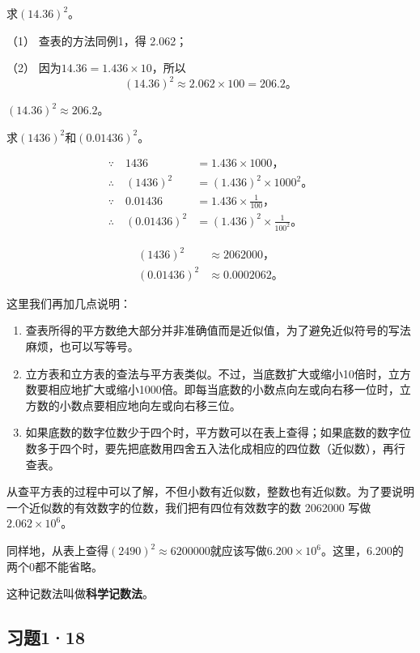  求\((14.36)^2\)。

 （1） 查表的方法同例1，得 2.062；

（2） 因为\(14.36 = 1.436 \times 10\)，所以
\[
(14.36)^2 \approx 2.062 \times 100 = 206.2。
\]

 \((14.36)^2 \approx 206.2\)。

 求\((1436)^2\)和\((0.01436)^2\)。

\begin{align*}
\because\quad 1436 &= 1.436 \times 1000， \\
\therefore\quad (1436)^2 &= (1.436)^2 \times 1000^2。 \\
\because\quad 0.01436 &= 1.436 \times \frac{1}{100}， \\
\therefore\quad (0.01436)^2 &= (1.436)^2 \times \frac{1}{100^2}。
\end{align*}

\begin{align*}
(1436)^2 &\approx 2062000， \\
(0.01436)^2 &\approx 0.0002062。
\end{align*}

这里我们再加几点说明：

\begin{enumerate}
\item 查表所得的平方数绝大部分并非准确值而是近似值，为了避免近似符号的写法麻烦，也可以写等号。
\item 立方表和立方表的查法与平方表类似。不过，当底数扩大或缩小10倍时，立方数要相应地扩大或缩小1000倍。即每当底数的小数点向左或向右移一位时，立方数的小数点要相应地向左或向右移三位。
\item 如果底数的数字位数少于四个时，平方数可以在表上查得；如果底数的数字位数多于四个时，要先把底数用四舍五入法化成相应的四位数（近似数），再行查表。
\end{enumerate}

从查平方表的过程中可以了解，不但小数有近似数，整数也有近似数。为了要说明一个近似数的有效数字的位数，我们把有四位有效数字的数 2062000 写做\(2.062 \times 10^6\)。

同样地，从表上查得\((2490)^2 \approx 6200000\)就应该写做\(6.200 \times 10^6\)。这里，6.200的两个0都不能省略。

这种记数法叫做\textbf{科学记数法}。

\subsection{习题1·18}

